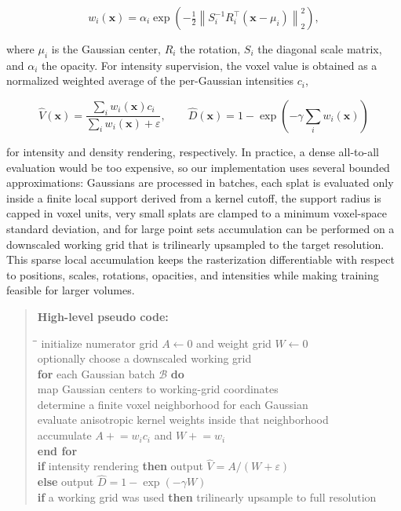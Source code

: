 \documentclass[runningheads]{llncs}
\begin{document}
\begin{equation}
w_i(\mathbf{x}) = \alpha_i \exp\left(-\tfrac{1}{2}\left\|S_i^{-1} R_i^\top (\mathbf{x}-\mu_i)\right\|_2^2\right),
\end{equation}

where $\mu_i$ is the Gaussian center, $R_i$ the rotation, $S_i$ the diagonal scale matrix, and $\alpha_i$ the opacity. For intensity supervision, the voxel value is obtained as a normalized weighted average of the per-Gaussian intensities $c_i$,

\begin{equation}
\hat{V}(\mathbf{x}) = \frac{\sum_i w_i(\mathbf{x}) c_i}{\sum_i w_i(\mathbf{x}) + \varepsilon},
\qquad
\hat{D}(\mathbf{x}) = 1 - \exp\left(-\gamma \sum_i w_i(\mathbf{x})\right)
\end{equation}

for intensity and density rendering, respectively. In practice, a dense all-to-all evaluation would be too expensive, so our implementation uses several bounded approximations: Gaussians are processed in batches, each splat is evaluated only inside a finite local support derived from a kernel cutoff, the support radius is capped in voxel units, very small splats are clamped to a minimum voxel-space standard deviation, and for large point sets accumulation can be performed on a downscaled working grid that is trilinearly upsampled to the target resolution. This sparse local accumulation keeps the rasterization differentiable with respect to positions, scales, rotations, opacities, and intensities while making training feasible for larger volumes.

\begin{quote}
\noindent\textbf{High-level pseudo code:}
\begin{tabbing}
\hspace{1.2em}\=\hspace{1.2em}\=\kill
initialize numerator grid $A \leftarrow 0$ and weight grid $W \leftarrow 0$ \\
optionally choose a downscaled working grid \\
\textbf{for} each Gaussian batch $\mathcal{B}$ \textbf{do} \\
\> map Gaussian centers to working-grid coordinates \\
\> determine a finite voxel neighborhood for each Gaussian \\
\> evaluate anisotropic kernel weights inside that neighborhood \\
\> accumulate $A \mathrel{+}= w_i c_i$ and $W \mathrel{+}= w_i$ \\
\textbf{end for} \\
\textbf{if} intensity rendering \textbf{then} output $\hat{V} = A / (W + \varepsilon)$ \\
\textbf{else} output $\hat{D} = 1 - \exp(-\gamma W)$ \\
\textbf{if} a working grid was used \textbf{then} trilinearly upsample to full resolution
\end{tabbing}
\end{quote}
\end{document}
